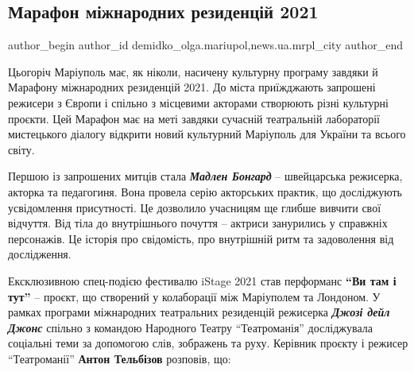  
 
 
 
 
 
\subsection{Марафон міжнародних резиденцій 2021}
\label{sec:05_09_2021.stz.news.ua.mrpl_city.1.marafon_mizhn_rezydencij_2021}
 
\ifcmt
 author_begin
   author_id demidko_olga.mariupol,news.ua.mrpl_city
 author_end
\fi

Цьогоріч Маріуполь має, як ніколи, насичену культурну програму завдяки й
Марафону міжнародних резиденцій 2021. До міста приїжджають запрошені режисери з
Європи і спільно з місцевими акторами створюють різні культурні проєкти. Цей
Марафон має на меті завдяки сучасній театральній лабораторії мистецького
діалогу відкрити новий культурний Маріуполь для України та всього світу.


Першою із запрошених митців стала \emph{\textbf{Мадлен Бонгард}} – швейцарська режисерка,
акторка та педагогиня. Вона провела серію акторських практик, що досліджують
усвідомлення присутності. Це дозволило учасницям ще глибше вивчити свої
відчуття. Від тіла до внутрішнього почуття – актриси занурились у справжніх
персонажів. Це історія про свідомість, про внутрішній ритм та задоволення від
дослідження.

Ексклюзивною спец-подією фестивалю iStage 2021 став перформанс  \textbf{\enquote{Ви там і тут}}
– проєкт, що створений у колаборації між Маріуполем та Лондоном. У рамках
програми міжнародних театральних резиденцій режисерка \emph{\textbf{Джозі дейл Джонс}}  спільно
з командою Народного Театру \enquote{Театроманія} досліджувала соціальні теми за
допомогою слів, зображень та руху. Керівник проєкту і режисер \enquote{Театроманії}
\textbf{Антон Тельбізов} розповів, що:


